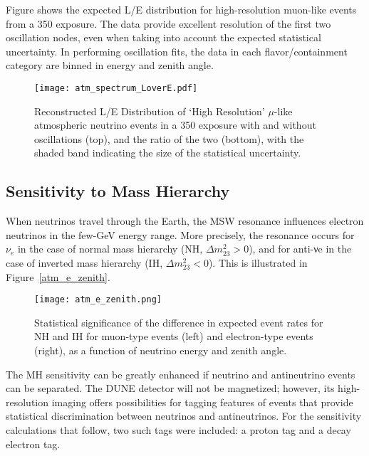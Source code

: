Figure shows the expected L/E distribution for high-resolution muon-like 
events from a \SI{350}{\ktyr} exposure. The data provide excellent resolution of the 
first two oscillation nodes, even when taking into account the expected statistical uncertainty.
In performing oscillation fits, the data in each flavor/containment category are 
binned in energy and zenith angle. 

\begin{figure}[!htb]
\centering
\texttt{[image: atm\_spectrum\_LoverE.pdf]}
\caption[Reconstructed L/E Distribution of `High Resolution' Atmospheric Neutrinos]
{Reconstructed L/E Distribution of `High Resolution'
$\mu$-like atmospheric neutrino events in a \SI{350}{\ktyr} exposure with and
without oscillations (top), and the ratio of the two (bottom), with the
shaded band indicating the size of the statistical uncertainty.}
\label{fig:lovere}
\end{figure}

\subsection{Sensitivity to Mass Hierarchy}

When neutrinos travel through the Earth, the MSW resonance influences 
electron neutrinos in the few-GeV energy range. More precisely, the resonance 
occurs for $\nu_e$ in the case of normal mass hierarchy (NH, $\Delta m^2_{23} >0$), and for 
anti-νe in the case of inverted mass hierarchy (IH, $\Delta m^2_{23} <0$). This is 
illustrated in Figure~\ref{atm_e_zenith}. 

\begin{figure}[!htb]
\centering
\texttt{[image: atm\_e\_zenith.png]}
\caption[Zenith Angle vs. Energy For Atmospheric Neutrinos]
{Statistical significance of the difference in expected event rates for NH and IH for 
muon-type events (left) and electron-type events (right), as a function of neutrino
energy and zenith angle.}
\label{fig:atm_e_zenith}
\end{figure}

The MH sensitivity can be greatly enhanced if neutrino and antineutrino events can be 
separated. The DUNE detector will not be magnetized; however, its high-resolution 
imaging offers possibilities for tagging features of events that provide statistical 
discrimination between neutrinos and antineutrinos. For the sensitivity calculations 
that follow, two such tags were included: a proton tag and a decay electron tag. 

